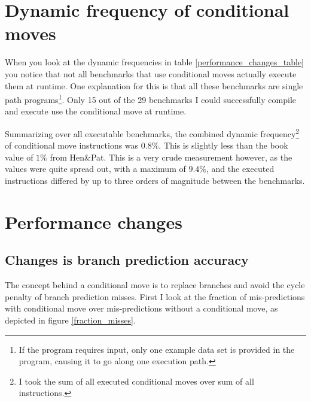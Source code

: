 \documentclass[12pt,twoside,notitlepage]{report}
\begin{document}
\section{Dynamic frequency of conditional moves}

When you look at the dynamic frequencies in table \ref{performance_changes_table} you notice that not all benchmarks that use conditional moves actually execute them at runtime. One explanation for this is that all these benchmarks are single path programs\footnote{If the program requires input, only one example data set is provided in the program, causing it to go along one execution path.}. Only 15 out of the 29 benchmarks I could successfully compile and execute use the conditional move at runtime.
 
Summarizing over all executable benchmarks, the combined dynamic frequency\footnote{I took the sum of all executed conditional moves over sum of all instructions.} of conditional move instructions was $0.8\%$. This is slightly less than the book value of $1\%$ from Hen\&Pat\cite{HenPat2012}. This is a very crude measurement however, as the values were quite spread out, with a maximum of $9.4\%$, and the executed instructions differed by up to three orders of magnitude between the benchmarks.

\section{Performance changes}

\subsection{Changes is branch prediction accuracy}

The concept behind a conditional move is to replace branches and avoid the cycle penalty of branch prediction misses. First I look at the fraction of mis-predictions with conditional move over mis-predictions without a conditional move, as depicted in figure \ref{fraction_misses}.
\end{document}
